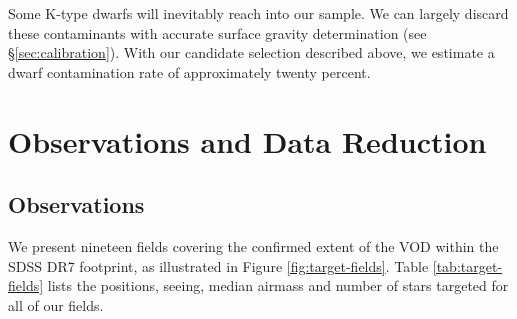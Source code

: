 \documentclass{emulateapj}
\begin{document}

Some K-type dwarfs will inevitably reach into our sample. We can largely discard these contaminants with accurate surface gravity determination (see \S\ref{sec:calibration}). With our candidate selection described above, we estimate a dwarf contamination rate of approximately twenty percent.

\section{Observations and Data Reduction}
\subsection{Observations}
We present nineteen fields covering the confirmed extent of the VOD within the SDSS DR7 footprint, as illustrated in Figure \ref{fig:target-fields}. Table \ref{tab:target-fields} lists the positions, seeing, median airmass and number of stars targeted for all of our fields. 
\end{document}
